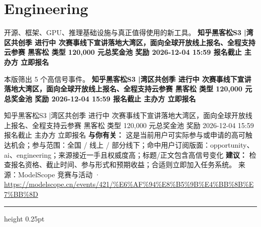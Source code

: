 \documentclass[10.5pt]{ctexart}
\begin{document}
\section*{Engineering}
{\color{ormuted} 开源、框架、GPU、推理基础设施与真正值得使用的新工具。}
\vspace{2mm}
{\LARGE\bfseries 知乎黑客松S3 |湾区共创季 进行中 次赛事线下宣讲落地大湾区，面向全球开放线上报名、全程支持云参赛 黑客松 类型 120,000 元总奖金池 奖励 2026-12-04 15:59 报名截止 主办方 立即报名}\par
\vspace{1mm}
{\color{ormuted} 本版筛出 5 个高信号事件。}
\vspace{3mm}
{\Large\bfseries 知乎黑客松S3 |湾区共创季 进行中 次赛事线下宣讲落地大湾区，面向全球开放线上报名、全程支持云参赛 黑客松 类型 120,000 元总奖金池 奖励 2026-12-04 15:59 报名截止 主办方 立即报名}\par
知乎黑客松S3 |湾区共创季 进行中 次赛事线下宣讲落地大湾区，面向全球开放线上报名、全程支持云参赛 黑客松 类型 120,000 元总奖金池 奖励 2026-12-04 15:59 报名截止 主办方 立即报名
\textbf{与你有关：} 这是当前用户可实际参与或申请的高可触达机会；参与范围：全国 / 线上 / 部分线下；命中用户订阅版面：opportunity、ai、engineering；来源接近一手且权威度高；标题/正文包含高信号变化
\textbf{建议：} 检查报名资格、截止时间、参与形式和预期收益；合适则立即加入任务系统。
{\footnotesize\color{ormuted} 来源：ModelScope 竞赛与活动 · \url{https://modelscope.cn/events/421/%E6%AF%94%E8%B5%9B%E4%BB%8B%E7%BB%8D}}
\vspace{4mm}
\hrule height 0.25pt
\vspace{3mm}
\end{document}
